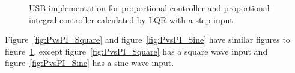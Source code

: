 \begin{figure}[!htbp]
{    \label{fig:PitchVoltage_LQR_RMSE_Step}
    }    
    \caption{USB implementation for proportional controller and proportional-integral controller calculated by LQR with a step input.}
    \label{fig:PvsPI_Step}
\end{figure}
Figure~\ref{fig:PvsPI_Square} and figure~\ref{fig:PvsPI_Sine} have similar figures to figure~\ref{fig:PvsPI_Step}, except figure~\ref{fig:PvsPI_Square} has a square wave input and figure~\ref{fig:PvsPI_Sine} has a sine wave input.
